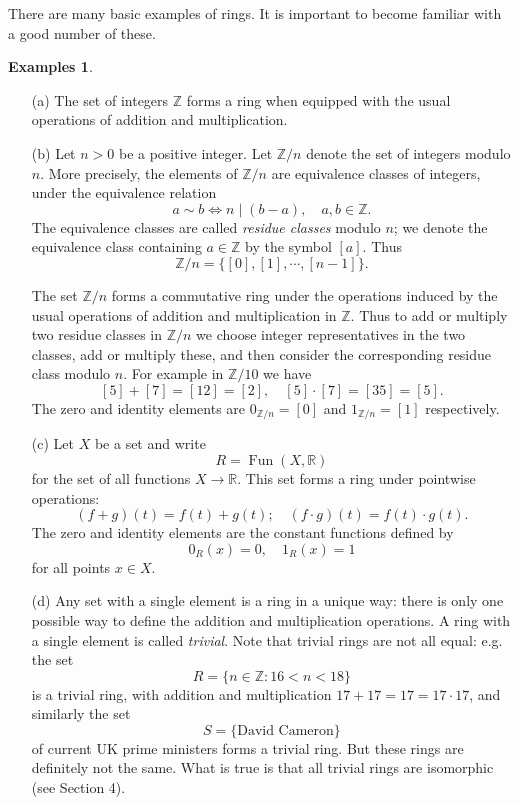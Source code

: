 \documentclass [12pt,oneside,a4paper,mathscr]{amsart}
\theoremstyle{definition}
\newtheorem{examples}[thm]{Examples}
\newcommand{\R}{\mathbb{R}}
\newcommand{\Z}{\mathbb Z}
\newcommand{\Fun}{\operatorname{Fun}}
\newcommand{\divides}{\mid}
\begin{document}
\smallskip
There are many basic examples of rings. It is important to become familiar with a good number of these.


\begin{examples}
\label{blah}
\begin{itemize}
\item[(a)] The set of integers $\Z$ forms a ring when equipped with the usual operations of addition and multiplication.
\smallskip

\item[(b)]  Let $n>0$ be a positive integer.  Let $\Z/n$ denote the set of  integers modulo $n$.   More precisely, the elements of $\Z/n$ are equivalence classes of integers, under the equivalence relation\[a\sim b \iff n\divides (b-a), \quad a,b\in \Z.\]
The equivalence classes are called \emph{residue classes} modulo $n$; we denote the equivalence class containing $a\in \Z$ by the symbol $[a]$. Thus
 \[\Z/n=\{[0],[1], \cdots,[n-1]\}.\]

The set $\Z/n$ forms a commutative ring under the  operations induced by the usual operations of addition and multiplication in $\Z$. Thus to add or multiply two residue classes in $\Z/n$ we choose integer representatives in the two classes, add or multiply these, and then consider the corresponding residue class modulo $n$. For example in $\Z/{10}$ we have
\[ [5] + [7] = [12] = [2], \quad [5] \cdot [7] = [35] = [5].\]  
The zero and identity elements are $0_{\Z/n}=[0]$ and $1_{\Z/n}=[1]$ respectively.
\smallskip

\item[(c)] Let $X$ be a  set and write \[R=\Fun(X,\R)\] for the set of all functions $ X \to \R$.  This set forms a ring under pointwise operations:
\[(f+g)(t)= f(t)+g(t); \quad (f\cdot g)(t) = f(t)\cdot g(t).\]
The zero and identity elements are  the constant functions defined by
\[0_R(x)=0, \quad 1_R(x)=1\]
 for all  points $x\in X$.
\smallskip

\item[(d)] Any set with a single element is a ring in a unique way: there is only one possible way to define the addition and multiplication  operations. A ring with a single element is called  \emph{trivial}.
Note that trivial rings are not all equal: e.g.
the set \[R=\{n\in \Z: 16<n<18\}\]
is a trivial ring, with addition and multiplication $17+17=17=17\cdot 17$, and similarly the set \[S=\{\text{David Cameron}\}\] of current UK prime ministers forms a trivial ring. But these rings are definitely not the same. 
What is true is that all trivial rings are isomorphic (see Section 4).
\end{itemize}
\end{examples}
\end{document}
